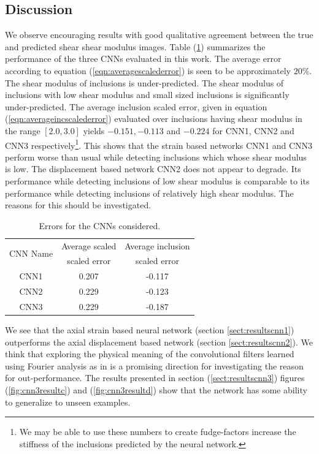 \documentclass[10pt]{article}
\begin{document}
\subsection{\label{sect:discussion}Discussion}
We observe encouraging results with good qualitative agreement between the true and predicted shear shear modulus images. Table (\ref{table:cnnstatsummary}) summarizes the performance of the three CNNs evaluated in this work. The average error according to equation (\ref{eqn:averagescalederror}) is seen to be approximately ${20\%}$. The shear modulus of inclusions is under-predicted. The shear modulus of inclusions with low shear modulus and small sized inclusions is significantly under-predicted. The average inclusion scaled error, given in equation (\ref{eqn:averageincscalederror}) evaluated over inclusions having shear modulus in the range $[2.0,3.0]$ yields $-0.151,-0.113$ and $-0.224$ for CNN1, CNN2 and CNN3 respectively\footnote{We may be able to use these numbers to create fudge-factors increase the stiffness of the inclusions predicted by the neural network.}. This shows that the strain based networks CNN1 and CNN3 perform worse than usual while detecting inclusions which whose shear modulus is low. The displacement based network CNN2 does not appear to degrade. Its performance while detecting inclusions of low shear modulus is comparable to its performance while detecting inclusions of relatively high shear modulus. The reasons for this should be investigated.


\begin{table}
  \centering
  \begin{tabular}{|c|c|c|}
    \hline
    \multirow{2}{*}{CNN Name} & Average scaled & Average inclusion \\
                              & scaled error   & scaled error      \\
    \hline
    CNN1     & 0.207 & -0.117\\
    \hline
    CNN2     & 0.229 & -0.123\\
    \hline
    CNN3     & 0.229 & -0.187\\
    \hline
  \end{tabular}
  \caption{\label{table:cnnstatsummary} Errors for the CNNs considered.}
\end{table}  

We see that the axial strain based neural network (section {\ref{sect:resultscnn1}}) outperforms the axial displacement based network (section \ref{sect:resultscnn2}). We think that exploring the physical meaning of the convolutional filters learned using Fourier analysis as in \cite{paper:pateloberai2019} is a promising direction for investigating the reason for out-performance. The results presented in section (\ref{sect:resultscnn3}) figures (\ref{fig:cnn3resultc}) and (\ref{fig:cnn3resultd}) show that the network has some ability to generalize to unseen examples.
%
\end{document}
